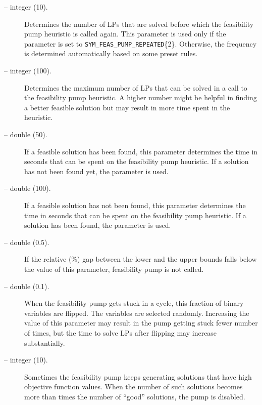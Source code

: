 \begin{description}
\item[ -- integer (10).] 
Determines the number of LPs that are solved before which the feasibility pump
heuristic is called again. This parameter is used only if the parameter
 is set to {\tt SYM\_FEAS\_PUMP\_REPEATED}\{2\}. Otherwise,
the frequency is determined automatically based on some preset rules. 

\item[ -- integer (100).] 
Determines the maximum number of LPs that can be solved in a call to the
feasibility pump heuristic. A higher number might be helpful in finding a
better feasible solution but may result in more time spent in the heuristic.

\item[ -- double (50).] 
If a feasible solution has been found, this parameter determines the time in
seconds that can be spent on the feasibility pump heuristic. If a solution has
not been found yet, the parameter  is used.

\item[ -- double (100).] 
If a feasible solution has not been found, this parameter determines the time in
seconds that can be spent on the feasibility pump heuristic. If a solution has
been found, the parameter  is used.

\item[ -- double (0.5).] 
If the relative (\%) gap between the lower and the upper bounds falls below the
value of this parameter, feasibility pump is not called.

\item[ -- double (0.1).] 
When the feasibility pump gets stuck in a cycle, this fraction of binary
variables are flipped. The variables are selected randomly. Increasing the
value of this parameter may result in the pump getting stuck fewer number of
times, but the time to solve LPs after flipping may increase substantially.

\item[ -- integer (10).] 
Sometimes the feasibility pump keeps generating solutions that have high
objective function values. When the number of such solutions becomes more than
 times the number of ``good'' solutions, the pump
is disabled.

\end{description}
